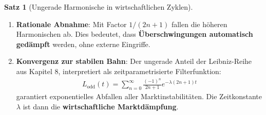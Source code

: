 \documentclass[a4paper,12pt,twoside]{report}
\theoremstyle{definition}
\newtheorem{satz}{Satz}
\begin{document}
\begin{satz}[Ungerade Harmonische in wirtschaftlichen Zyklen]
\begin{enumerate}
\item \textbf{Rationale Abnahme}: Mit Factor $1/(2n+1)$ fallen die höheren Harmonischen ab. Dies bedeutet, dass \textbf{Überschwingungen automatisch gedämpft} werden, ohne externe Eingriffe.

\item \textbf{Konvergenz zur stabilen Bahn}: Der ungerade Anteil der Leibniz-Reihe aus Kapitel 8, interpretiert als zeitparametrisierte Filterfunktion:
\begin{align}
L_{\text{odd}}(t) = \sum_{n=0}^{\infty} \frac{(-1)^n}{2n+1} e^{-\lambda(2n+1)t}
\end{align}
garantiert exponentielles Abfallen aller Marktinstabilitäten. Die Zeitkonstante $\lambda$ ist dann die \textbf{wirtschaftliche Marktdämpfung}.

\end{enumerate}

\end{satz}
\end{document}
